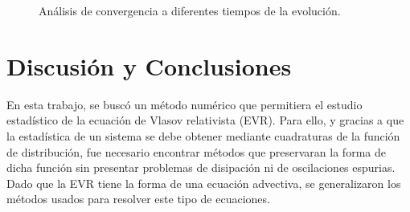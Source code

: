 \documentclass[11pt,twoside,openright,spanish]{report}
\numberwithin{equation}{chapter}
\numberwithin{figure}{chapter}
\numberwithin{table}{chapter}
\begin{document}
\begin{figure}[H]
	\centering
	
	
	\caption{Análisis de convergencia a diferentes tiempos de la evolución.}
	\label{convergenceksLmenor}
\end{figure}

\chapter{Discusión y Conclusiones}
\noindent
En esta trabajo, se buscó un método numérico que permitiera el estudio estadístico de la ecuación de Vlasov relativista (EVR). Para ello, y gracias a que la estadística de un sistema se debe obtener mediante cuadraturas de la función de distribución, fue necesario encontrar métodos que preservaran la forma de dicha función sin presentar problemas de disipación ni de oscilaciones espurias. Dado que la EVR tiene la forma de una ecuación advectiva, se generalizaron los métodos usados para resolver este tipo de ecuaciones.
\end{document}
